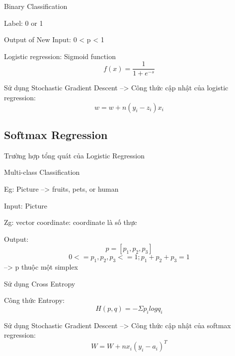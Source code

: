 \documentclass{article}
\begin{document}
Binary Classification

Label: 0 or 1

Output of New Input: 0 < p < 1

Logistic regression: Sigmoid function
$$f(x) = \frac{1}{1+e^{-s}}$$

Sử dụng Stochastic Gradient Descent --> Công thức cập nhật của logistic regression:
$$w = w + n(y_i - z_i)x_i $$

\subsection{Softmax Regression}

Trường hợp tổng quát của Logistic Regression

Multi-class Classification

Eg: Picture --> fruits, pets, or human

Input: Picture

Zg: vector coordinate: coordinate là số thực

Output:
$$p = [p_1, p_2, p_3]$$
$$0 <= p_1, p_2, p_3 <= 1; p_1 + p_2 + p_3 = 1$$
--> p thuộc một simplex

Sử dụng Cross Entropy

Công thức Entropy: $$H(p,q) = - \Sigma p_i log q_i$$

Sử dụng Stochastic Gradient Descent --> Công thức cập nhật của softmax regression:
$$W = W + n x_i(y_i - a_i)^T $$
\end{document}
